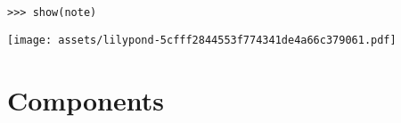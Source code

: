 \begin{comment}
<abjad>
show(note)
</abjad>
\end{comment}

\begin{abjadbookoutput}
\begin{singlespacing}
\vspace{-0.5\baselineskip}
\begin{verbatim}
>>> show(note)
\end{verbatim}
\noindent\texttt{[image: assets/lilypond-5cfff2844553f774341de4a66c379061.pdf]}
\end{singlespacing}
\end{abjadbookoutput}

\section{Components}
\label{sec:components}

\begin{comment}
-   Every component may be named.
-   components, leaves, containers (and contexts)
-   components are formattable and illustrable
-   components are mutable, while indicators are generally not
    -   likewise, durations and pitches are immutable

-   count-time components
    -   note, chord, rest, skip, container, tuplet, measure
-   non-count-time (contexts)
    -   voice, staff, staff group, score

-   leaves do not contain anything else
    -   chord do *not* contain notes
    -   chords and notes contain note heads
    -   chord and notes share a single stem
    -   this must be disambiguated from note columns

-   all containers derive their duration from their contents (with some
    exceptions, but even there a mismatch is an error)
-   written duration, prolated duration, pre-prolated duration, contents
    duration

-   One, and only one, parent per component. They *cannot* be in more than one
    container. This is both confusing, and liable to cause reference problems.
-   score hierarchy is not fixed: any node is the root, if it has no parent

-   contexts are assumed to last from the beginning to the end of the total
    timespan of the score, but in practice they may be intermittent
-   contexts may be named, allowing concatenation

-   Leaves reside at the "bottom" of the score hierarchy.

Work aspects of this into appropriate sections

-   inspect_()
-   not *inspect()*, as that would cause a name conflict with Python's inspect
    module
-   inspect(...).get_parentage()
-   inspect_(...).get_duration()
    -   in_seconds=True
-   inspect_(...).get_timespan()
    -   in_seconds=True
\end{comment}

